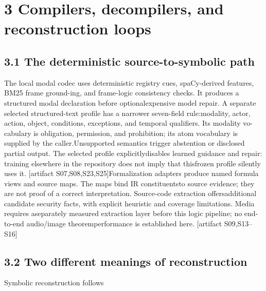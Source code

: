 \section*{3  Compilers, decompilers, and reconstruction loops}
\subsection*{3.1  The deterministic source-to-symbolic path}
\noindent
The local modal codec uses deterministic registry cues, spaCy-derived features, BM25 frame ground-\linebreak[4]
ing, and frame-logic consistency checks. It produces a structured modal declaration before optional\linebreak[4]
expensive model repair. A separate selected structured-text profile has a narrower seven-field rule:\linebreak[4]
modality, actor, action, object, conditions, exceptions, and temporal qualifiers. Its modality vo-\linebreak[4]
cabulary is obligation, permission, and prohibition; its atom vocabulary is supplied by the caller.\linebreak[4]
Unsupported semantics trigger abstention or disclosed partial output. The selected profile explicitly\linebreak[4]
disables learned guidance and repair: training elsewhere in the repository does not imply that this\linebreak[4]
frozen profile silently uses it. [artifact S07,S08,S23,S25]\linebreak[4]
Formalization adapters produce named formula views and source maps. The maps bind IR constituents\linebreak[4]
to source evidence; they are not proof of a correct interpretation. Source-code extraction offers\linebreak[4]
additional candidate security facts, with explicit heuristic and coverage limitations. Media requires a\linebreak[4]
separately measured extraction layer before this logic pipeline; no end-to-end audio/image theorem\linebreak[4]
performance is established here. [artifact S09,S13--S16]\par

\subsection*{3.2  Two different meanings of reconstruction}
\noindent
Symbolic reconstruction follows\par

